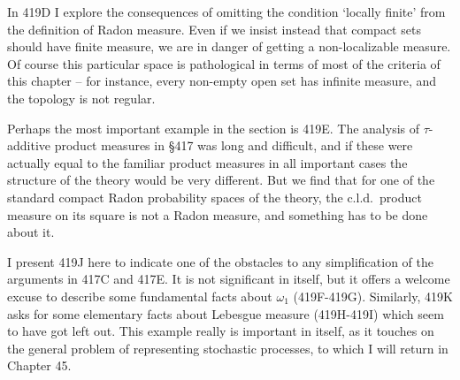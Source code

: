 {In 419D I explore the consequences of omitting the condition `locally
finite' from the definition of Radon measure.   Even if we insist
instead that compact sets should have finite measure, we are in danger
of getting a non-localizable measure.   Of course this particular space
is pathological in terms of most of the criteria of this chapter -- for
instance, every non-empty open set has infinite measure, and the
topology is not regular.

Perhaps the most important example in the section is 419E.   The
analysis of $\tau$-additive product measures in \S417 was long and
difficult, and if these were actually equal to the familiar product
measures in all important cases the structure of the theory would be
very different.   But we find
that for one of the standard compact Radon probability spaces of the
theory, the c.l.d.\ product measure on its square is not a Radon
measure, and something has to be done about it.


I present 419J here to indicate one of the obstacles to any
simplification of the arguments in 417C and 417E.   It is not
significant in itself, but it offers a
welcome excuse to describe some fundamental facts about $\omega_1$
(419F-419G).   Similarly, 419K asks for some
elementary facts about Lebesgue measure (419H-419I) which seem to have
got left out.   This example really is important in itself, as it
touches on the general problem of representing stochastic processes, to
which I will return in Chapter 45.
}%

\discrpage  %


